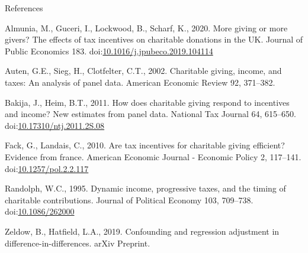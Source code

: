 \documentclass[
  ignorenonframetext,
  aspectratio=169]{beamer}
\newlength{\cslhangindent}
\newlength{\cslentryspacingunit} %
\newenvironment{CSLReferences}[2] %
 {%
  \setlength{\parindent}{0pt}
  \ifodd #1
  \let\oldpar\par
  \def\par{\hangindent=\cslhangindent\oldpar}
  \fi
  \setlength{\parskip}{#2\cslentryspacingunit}
 }%
 {}
\begin{document}
\begin{frame}[allowframebreaks]{References}
\hypertarget{refs}{}
\begin{CSLReferences}{1}{0}
\leavevmode\hypertarget{ref-Almunia2020}{}%
Almunia, M., Guceri, I., Lockwood, B., Scharf, K., 2020. More giving or more givers? The effects of tax incentives on charitable donations in the UK. Journal of Public Economics 183. doi:\href{https://doi.org/10.1016/j.jpubeco.2019.104114}{10.1016/j.jpubeco.2019.104114}

\leavevmode\hypertarget{ref-Auten2002}{}%
Auten, G.E., Sieg, H., Clotfelter, C.T., 2002. Charitable giving, income, and taxes: An analysis of panel data. American Economic Review 92, 371--382.

\leavevmode\hypertarget{ref-Bakija2011}{}%
Bakija, J., Heim, B.T., 2011. How does charitable giving respond to incentives and income? New estimates from panel data. National Tax Journal 64, 615--650. doi:\href{https://doi.org/10.17310/ntj.2011.2S.08}{10.17310/ntj.2011.2S.08}

\leavevmode\hypertarget{ref-Fack2010}{}%
Fack, G., Landais, C., 2010. Are tax incentives for charitable giving efficient? Evidence from france. American Economic Journal - Economic Policy 2, 117--141. doi:\href{https://doi.org/10.1257/pol.2.2.117}{10.1257/pol.2.2.117}

\leavevmode\hypertarget{ref-Randolph1995}{}%
Randolph, W.C., 1995. Dynamic income, progressive taxes, and the timing of charitable contributions. Journal of Political Economy 103, 709--738. doi:\href{https://doi.org/10.1086/262000}{10.1086/262000}

\leavevmode\hypertarget{ref-Zeldow2019}{}%
Zeldow, B., Hatfield, L.A., 2019. Confounding and regression adjustment in difference-in-differences. arXiv Preprint.

\end{CSLReferences}
\end{frame}
\end{document}
